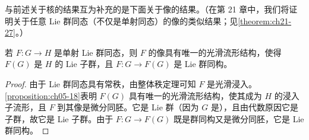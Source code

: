 \documentclass[../../main.tex]{subfiles}
\begin{document}
与前述关于核的结果互为补充的是下面关于像的结果。（在第 21 章中，我们将证明关于任意 Lie 群同态（不仅是单射同态）的像的类似结果；见\cref{theorem:ch21-27}。）

\begin{proposition}\label{proposition:ch07-17}
若 $F\colon G\to H$ 是单射 Lie 群同态，则 $F$ 的像具有唯一的光滑流形结构，使得 $F(G)$ 是 $H$ 的 Lie 子群，且 $F\colon G\to F(G)$ 是 Lie 群同构。
\end{proposition}

\begin{proof}
由于 Lie 群同态具有常秩，由整体秩定理可知 $F$ 是光滑浸入。\cref{proposition:ch05-18}表明 $F(G)$ 具有唯一的光滑流形结构，使其成为 $H$ 的浸入子流形，且 $F$ 到其像是微分同胚。它是 Lie 群（因为 $G$ 是），且由代数原因它是子群，故它是 Lie 子群。由于 $F\colon G\to F(G)$ 既是群同构又是微分同胚，它是 Lie 群同构。
\end{proof}
\end{document}
